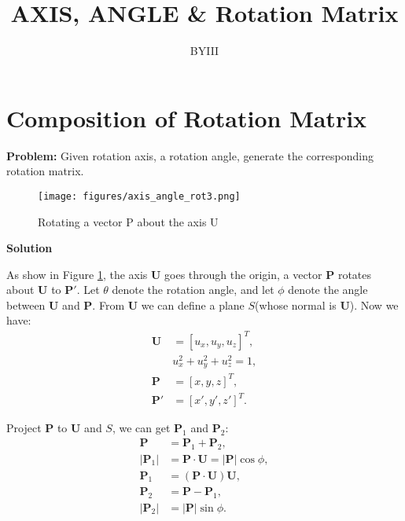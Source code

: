 \documentclass{article}
\begin{document}
\author{BYIII}
\title{AXIS, ANGLE \& Rotation Matrix}
\date{}

\maketitle

\section{Composition of Rotation Matrix}
\textbf{Problem:} Given rotation axis, a rotation angle, generate the corresponding rotation matrix.

\begin{figure}[!h]
\centering
\texttt{[image: figures/axis\_angle\_rot3.png]}
\caption{Rotating a vector P about the axis U}
\label{fig1}
\end{figure}

\noindent\textbf{Solution}


As show in Figure \ref{fig1}, the axis \textbf{U} goes through the origin, a vector \textbf{P} rotates about \textbf{U} to $\mathbf{P}'$. Let $\theta$ denote the rotation angle, and let $\phi$ denote the angle between \textbf{U} and \textbf{P}. From \textbf{U} we can define a plane $S$(whose normal is \textbf{U}). Now we have: 
\begin{displaymath}
\begin{split}
\mathbf{U} &= [u_x, u_y, u_z]^T, \\
&  u_x^2+u_y^2+u_z^2 = 1, \\
\mathbf{P} &= [x, y, z]^T, \\
\mathbf{P}' &= [x', y', z']^T.
\end{split}
\end{displaymath}

Project \textbf{P} to \textbf{U} and $S$, we can get $\mathbf{P}_1$ and $\mathbf{P}_2$:
\begin{displaymath}
\begin{split}
\mathbf{P} &= \mathbf{P}_1+\mathbf{P}_2, \\
|\mathbf{P}_1| &= \mathbf{P}\cdot\mathbf{U} = |\mathbf{P}|\cos{\phi}, \\
\mathbf{P}_1 &= (\mathbf{P}\cdot\mathbf{U})\mathbf{U}, \\
\mathbf{P}_2 &= \mathbf{P} - \mathbf{P}_1, \\
|\mathbf{P}_2| &=  |\mathbf{P}|\sin{\phi}.
\end{split}
\end{displaymath}
\end{document}
